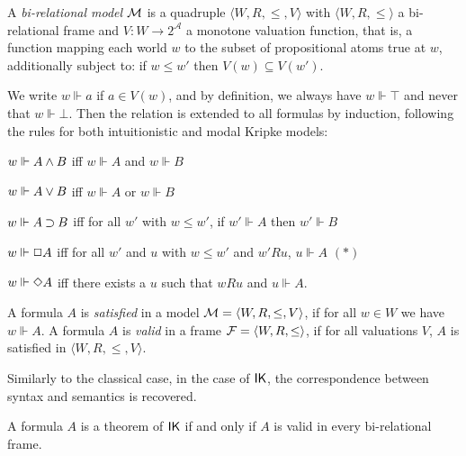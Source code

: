 \documentclass[twoside]{aiml18}
\begin{document}
\begin{definition}
	A \emph{bi-relational model} $\mathcal{M}$ is a quadruple $\langle W, R,\le,V \rangle$ with $\langle W, R, \le \rangle$ a bi-relational frame and $V\colon W \to 2^\mathcal{A}$ a monotone valuation function, that is, a function mapping each world $w$ to the subset of propositional atoms true at $w$, additionally subject to:
	if $w \le w'$ then $V(w)\subseteq V(w')$.
\end{definition}

We write $w \Vdash a$ if $a \in V(w)$, and by definition, we always have $w \Vdash \top$ and never that $w \Vdash \bot$. 
%
Then the relation is extended to all formulas by induction, following the rules for both intuitionistic and modal Kripke models:

$w \Vdash A \mathbin{\wedge} B$ iff $w \Vdash A$ and $w \Vdash B$

$w \Vdash A \mathbin{\vee} B$ iff $w \Vdash A$ or $w \Vdash B$

$w \Vdash A \mathbin{\supset} B$ iff for all $w'$ with $w \le w'$, if $w' \Vdash A$ then $w' \Vdash B$

$w \Vdash \mathord{\Box} A$ iff for all $w'$ and $u$ with $w \le w'$ and $w'Ru$, $u \Vdash A$ \hfill $(\ast)$

$w \Vdash \mathord{\Diamond} A$ iff there exists a $u$ such that $wRu$ and $u \Vdash A$.



\begin{definition}
	A formula $A$ is \emph{satisfied} in a model $\mathcal{M} = \langle W, R, \le, V \rangle$, if for all $w \in W$ we have $w \Vdash A$.
	A formula $A$ is \emph{valid} in a frame $\mathcal{F} = \langle W, R, \le \rangle$, if for all valuations $V$, $A$ is satisfied in $\langle W, R, \le, V \rangle$.
\end{definition}



%

Similarly to the classical case, in the case of $\mathsf{IK}$, the correspondence between syntax and semantics is recovered.

\begin{theorem}\label{thm:plotkin}
	A formula $A$ is a theorem of $\mathsf{IK}$ if and only if $A$ is valid in every bi-relational frame.
\end{theorem}
\end{document}
